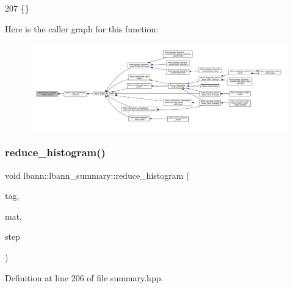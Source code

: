 \begin{DoxyCode}
207 \{\}
\end{DoxyCode}
Here is the caller graph for this function\+:\nopagebreak
\begin{figure}[H]
\begin{center}
\leavevmode
\includegraphics[width=350pt]{classlbann_1_1lbann__summary_a336143c9540d779381658beb4e841b73_icgraph}
\end{center}
\end{figure}
\mbox{\label{classlbann_1_1lbann__summary_a6303fa270a3b7179f361b47418f812ef}} 
\subsubsection{\texorpdfstring{reduce\+\_\+histogram()}{reduce\_histogram()}}
{\footnotesize\ttfamily void lbann\+::lbann\+\_\+summary\+::reduce\+\_\+histogram (\begin{DoxyParamCaption}\item[{const std\+::string}]{tag,  }\item[{const \hyperlink{base_8hpp_a9a697a504ae84010e7439ffec862b470}{Abs\+Dist\+Mat} \&}]{mat,  }\item[{int}]{step }\end{DoxyParamCaption})\hspace{0.3cm}{\ttfamily [inline]}}



Definition at line 206 of file summary.\+hpp.


